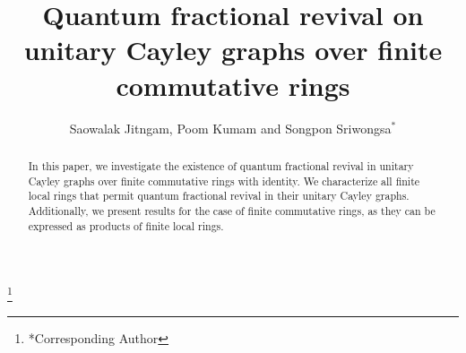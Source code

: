 \documentclass[12pt]{amsart}
\numberwithin{equation}{section}
\theoremstyle{definition}
\theoremstyle{definition} \numberwithin{equation}{section}
\begin{document}
\title[QFR on unitary Cayley graphs]{Quantum fractional revival on unitary Cayley
graphs over finite commutative rings}

\author{Saowalak Jitngam, Poom Kumam and Songpon Sriwongsa$^*$}

\thanks{*Corresponding Author}

\address{Saowalak Jitngam \\ Department of Mathematics \\ Faculty of Science
	\\ King Mongkut's University of Technology Thonburi (KMUTT) \\ 126 Pracha Uthit Rd., Bang Mod, Thung Khru \\ Bangkok 10140, Thailand}

\address{Poom Kumam \\ Department of Mathematics \\ Faculty of Science
	\\ King Mongkut's University of Technology Thonburi (KMUTT) \\ 126 Pracha Uthit Rd., Bang Mod, Thung Khru \\ Bangkok 10140, Thailand}

\address{Songpon Sriwongsa \\ Department of Mathematics \\ Faculty of Science
	\\ King Mongkut's University of Technology Thonburi (KMUTT) \\ 126 Pracha Uthit Rd., Bang Mod, Thung Khru \\ Bangkok 10140, Thailand}




\begin{abstract}
In this paper, we investigate the existence of quantum fractional revival in unitary Cayley graphs over finite commutative rings with identity. We characterize all finite local rings that permit quantum fractional revival in their unitary Cayley graphs. Additionally, we present results for the case of finite commutative rings, as they can be expressed as products of finite local rings.
\end{abstract}

\date{}
\end{document}
